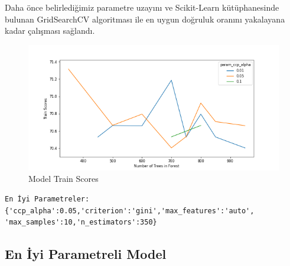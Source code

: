 \documentclass[12pt,twoside]{deuthesis}
\begin{document}
Daha önce belirlediğimiz parametre uzayını ve Scikit-Learn kütüphanesinde bulunan GridSearchCV algoritması ile en uygun doğruluk oranını yakalayana kadar çalışması sağlandı.
\begin{figure}

{\centering \includegraphics[width=1.1\linewidth,height=0.5\textheight]{figure/RF_Grid_Graph} 

}

\caption{Model Train Scores}\label{fig:unnamed-chunk-21}
\end{figure}
\begin{verbatim}
En İyi Parametreler:{'ccp_alpha':0.05,'criterion':'gini','max_features':'auto',
'max_samples':10,'n_estimators':350}
\end{verbatim}
\hypertarget{en-iyi-parametreli-model-1}{%
\subsection{En İyi Parametreli Model}\label{en-iyi-parametreli-model-1}}
\end{document}
